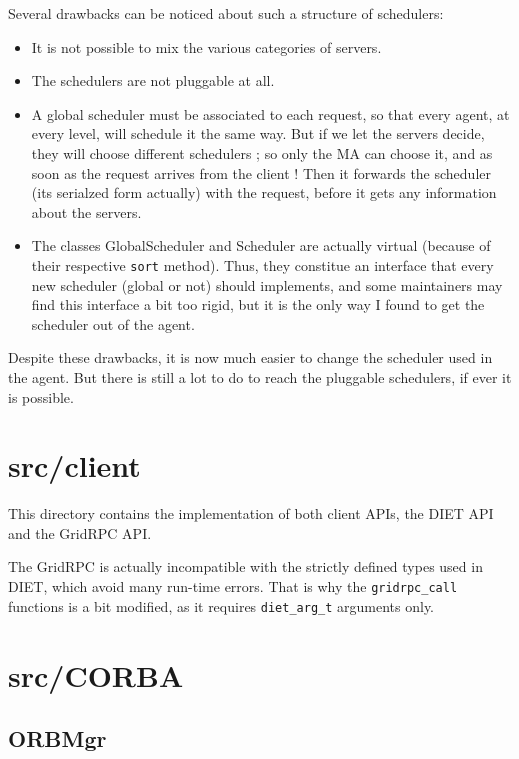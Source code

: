 Several drawbacks can be noticed about such a structure of schedulers:
\begin{itemize}
\item It is not possible to mix the various categories of servers.
\item The schedulers are not pluggable at all.
\item A global scheduler must be associated to each request, so that every
  agent, at every level, will schedule it the same way. But if we let the
  servers decide, they will choose different schedulers ; so only the MA can
  choose it, and as soon as the request arrives from the client ! Then it
  forwards the scheduler (its serialzed form actually) with the request, before
  it gets any information about the servers.
\item The classes \textsf{GlobalScheduler} and \textsf{Scheduler} are actually
  virtual (because of their respective \texttt{sort} method). Thus, they
  constitue an interface that every new scheduler (global or not) should
  implements, and some maintainers may find this interface a bit too rigid, but
  it is the only way I found to get the scheduler out of the agent.
\end{itemize}

Despite these drawbacks, it is now much easier to change the scheduler used in
the agent. But there is still a lot to do to reach the pluggable schedulers, if
ever it is possible.

\section{\textsf{src/client}}
\label{s:client}

This directory contains the implementation of both client APIs, the DIET API and
the GridRPC API.

The GridRPC is actually incompatible with the strictly defined types used in
DIET, which avoid many run-time errors. That is why the \texttt{gridrpc\_call}
functions is a bit modified, as it requires \texttt{diet\_arg\_t} arguments
only.



\section{\textsf{src/CORBA}}
\label{s:CORBA}

\subsection{\textsf{ORBMgr}}

